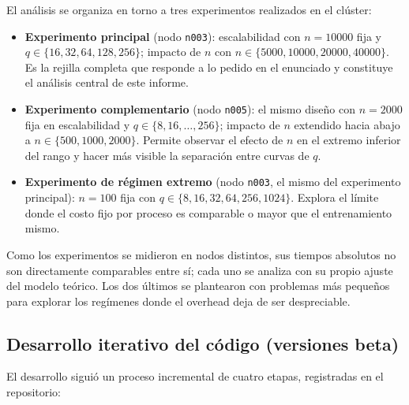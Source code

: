 \documentclass[11pt, a4paper]{article}
\begin{document}
El análisis se organiza en torno a tres experimentos realizados en el clúster:
\begin{itemize}
    \item \textbf{Experimento principal} (nodo \texttt{n003}): escalabilidad con $n = 10000$ fija y $q \in \{16, 32, 64, 128, 256\}$; impacto de $n$ con $n \in \{5000, 10000, 20000, 40000\}$. Es la rejilla completa que responde a lo pedido en el enunciado y constituye el análisis central de este informe.
    \item \textbf{Experimento complementario} (nodo \texttt{n005}): el mismo diseño con $n = 2000$ fija en escalabilidad y $q \in \{8, 16, \dots, 256\}$; impacto de $n$ extendido hacia abajo a $n \in \{500, 1000, 2000\}$. Permite observar el efecto de $n$ en el extremo inferior del rango y hacer más visible la separación entre curvas de $q$.
    \item \textbf{Experimento de régimen extremo} (nodo \texttt{n003}, el mismo del experimento principal): $n = 100$ fija con $q \in \{8, 16, 32, 64, 256, 1024\}$. Explora el límite donde el costo fijo por proceso es comparable o mayor que el entrenamiento mismo.
\end{itemize}

Como los experimentos se midieron en nodos distintos, sus tiempos absolutos no son directamente comparables entre sí; cada uno se analiza con su propio ajuste del modelo teórico. Los dos últimos se plantearon con problemas más pequeños para explorar los regímenes donde el overhead deja de ser despreciable.

\subsection{Desarrollo iterativo del código (versiones beta)}

El desarrollo siguió un proceso incremental de cuatro etapas, registradas en el repositorio:
\end{document}
